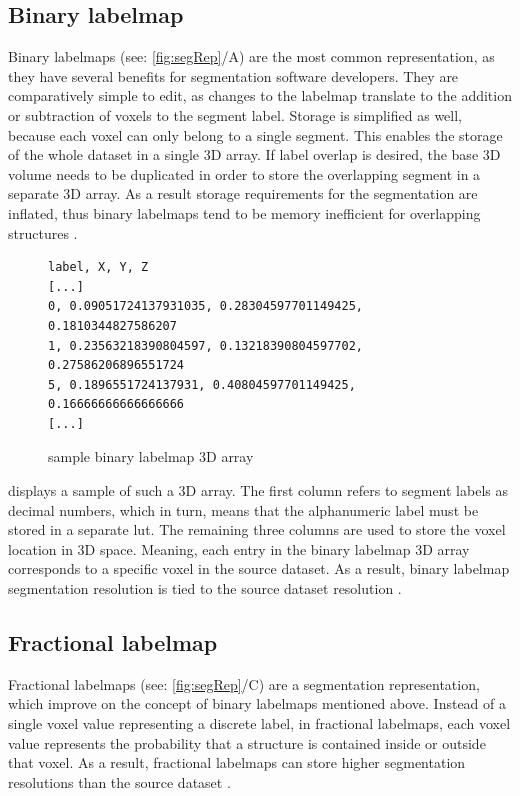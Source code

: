 \subsection{Binary labelmap}\label{s:b-binary-labelmap}
Binary labelmaps (see: \cref{fig:segRep}/A) are the most common representation, as they have several benefits for segmentation software developers.
They are comparatively simple to edit, as changes to the labelmap translate to the addition or subtraction of voxels to the segment label.
Storage is simplified as well, because each voxel can only belong to a single segment.
This enables the storage of the whole dataset in a single 3D array.
If label overlap is desired, the base 3D volume needs to be duplicated
in order to store the overlapping segment in a separate 3D array.
As a result storage requirements for the segmentation are inflated,
thus binary labelmaps tend to be memory inefficient for overlapping structures \cite{slicercommunity3DSlicerImage2022}.
\begin{figure}[h]
	\begin{verbatim}
label, X, Y, Z
[...]
0, 0.09051724137931035, 0.28304597701149425, 0.1810344827586207
1, 0.23563218390804597, 0.13218390804597702, 0.27586206896551724
5, 0.1896551724137931, 0.40804597701149425, 0.16666666666666666
[...]
\end{verbatim}
	\caption{sample binary labelmap 3D array}\label{fig:binary-array}
\end{figure}

\noindent
{} displays a sample of such a 3D array.
The first column refers to segment labels as decimal numbers,
which in turn, means that the alphanumeric label must be stored in a separate \acrfull{lut}.
The remaining three columns are used to store the voxel location in 3D space.
Meaning, each entry in the binary labelmap 3D array corresponds to a specific voxel in the source dataset.
As a result, binary labelmap segmentation resolution is tied to the source dataset resolution \cite{pinterPolymorphSegmentationRepresentation2019,sunderlandFractionalLabelmapsComputing2017,weber3DSlicerPlatform2022}.


\subsection{Fractional labelmap}\label{s:b-fractional-labelmap}
Fractional labelmaps (see: \cref{fig:segRep}/C) are a segmentation representation, which improve on the concept of binary labelmaps mentioned above.
Instead of a single voxel value representing a discrete label, in fractional labelmaps,
each voxel value represents the probability that a structure is contained inside or outside that voxel.
As a result, fractional labelmaps can store higher segmentation resolutions than the source dataset
\cite{warfieldFractionalSegmentationWhite1999,noePartialVolumeSegmentation2001,pinterPolymorphSegmentationRepresentation2019,sunderlandFractionalLabelmapsComputing2017,weber3DSlicerPlatform2022}.


